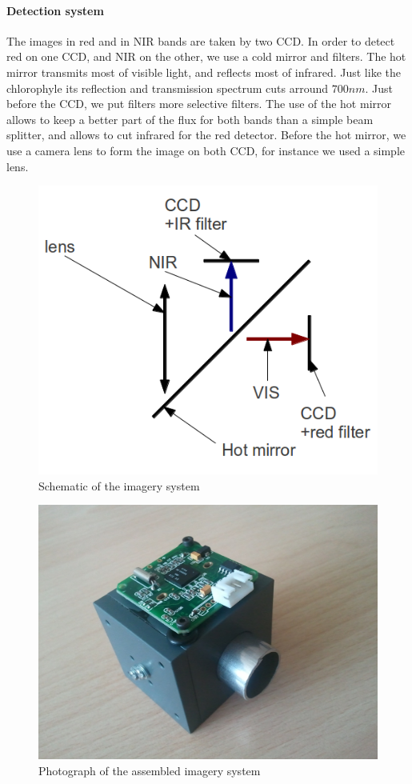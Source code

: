 \documentclass[twocolumn,10pt]{article}
\begin{document}
        \paragraph*{Detection system} The images in red and in NIR bands are taken by two CCD. In order to detect red on one CCD, and NIR on the other, we use a cold mirror and filters. The hot mirror transmits most of visible light, and reflects most of infrared. Just like the chlorophyle its reflection and transmission spectrum cuts arround $700nm$. Just before the CCD, we put filters more selective filters. The use of the hot mirror allows to keep a better part of the flux for both bands than a simple beam splitter, and allows to cut infrared for the red detector. Before the hot mirror, we use a camera lens to form the image on both CCD, for instance we used a simple lens.
        \begin{figure}[!h]
        \includegraphics[scale=.5]{sch_opt.png}
        \caption{Schematic of the imagery system}
        \end{figure}
        \begin{figure}[!h]
        \includegraphics[scale=.5]{cube.png}
        \caption{Photograph of the assembled imagery system}
        \end{figure}
\end{document}
